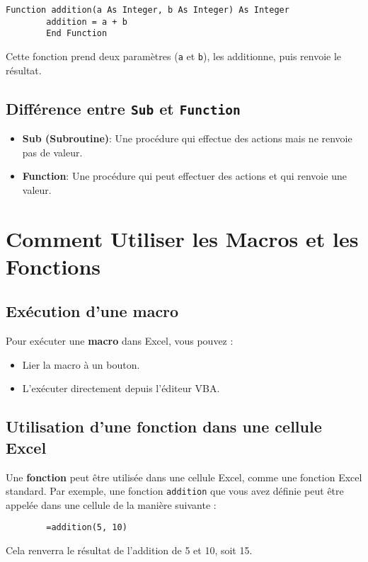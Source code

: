\documentclass[a4paper,12pt]{report}
\begin{document}
	\begin{lstlisting}[caption=Fonction avec retour de valeur]
		Function addition(a As Integer, b As Integer) As Integer
		addition = a + b
		End Function
	\end{lstlisting}
	
	Cette fonction prend deux paramètres (\texttt{a} et \texttt{b}), les additionne, puis renvoie le résultat.
	
	\subsection{Différence entre \texttt{Sub} et \texttt{Function}}
	\begin{itemize}
		\item \textbf{Sub (Subroutine)}: Une procédure qui effectue des actions mais ne renvoie pas de valeur.
		\item \textbf{Function}: Une procédure qui peut effectuer des actions et qui renvoie une valeur.
	\end{itemize}
	
	\section{Comment Utiliser les Macros et les Fonctions}
	\subsection{Exécution d'une macro}
	Pour exécuter une \textbf{macro} dans Excel, vous pouvez :
	\begin{itemize}
		\item Lier la macro à un bouton.
		\item L'exécuter directement depuis l'éditeur VBA.
	\end{itemize}
	
	\subsection{Utilisation d'une fonction dans une cellule Excel}
	Une \textbf{fonction} peut être utilisée dans une cellule Excel, comme une fonction Excel standard. Par exemple, une fonction \texttt{addition} que vous avez définie peut être appelée dans une cellule de la manière suivante :
	
	\begin{verbatim}
		=addition(5, 10)
	\end{verbatim}
	
	Cela renverra le résultat de l'addition de 5 et 10, soit 15.
	
\end{document}
